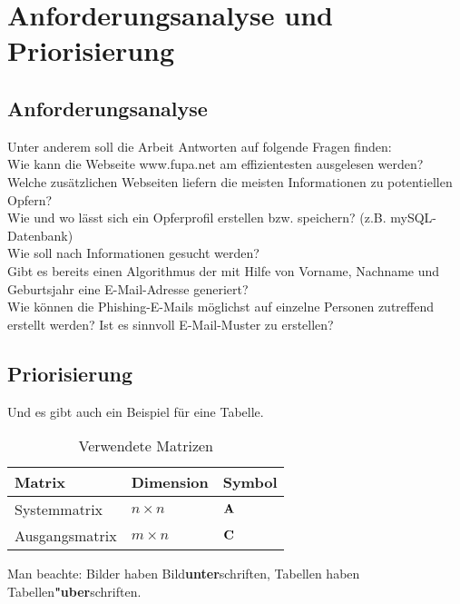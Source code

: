 
\chapter{Anforderungsanalyse und Priorisierung}  %
\label{cha:} %
\section{Anforderungsanalyse} %
\label{sec:} %

Unter anderem soll die Arbeit Antworten auf folgende Fragen finden:\\
Wie kann die Webseite www.fupa.net am effizientesten ausgelesen werden?\\
Welche zusätzlichen Webseiten liefern die meisten Informationen zu potentiellen Opfern?\\
Wie und wo lässt sich ein Opferprofil erstellen bzw. speichern? (z.B. mySQL-Datenbank)\\
Wie soll nach Informationen gesucht werden?\\
Gibt es bereits einen Algorithmus der mit Hilfe von Vorname, Nachname und Geburtsjahr eine E-Mail-Adresse generiert?\\
Wie können die Phishing-E-Mails möglichst auf einzelne Personen zutreffend erstellt werden? Ist es sinnvoll E-Mail-Muster zu erstellen?\\

\subsection{} %
\label{sse:}
\subsubsection{} %
\label{sss:}
\section{Priorisierung} %
\label{sec:} %
Und es gibt auch ein Beispiel für eine Tabelle.

\begin{table}
	\begin{center}
		\caption{Verwendete Matrizen}
		\label{matrizen}
		\begin{tabular}{|l|l|l|}
			\hline
			Matrix & Dimension & Symbol \\
			\hline
			Systemmatrix & $n \times n$ & ${\bf A}$  \\
			\hline
			Ausgangsmatrix & $m \times n$ & ${\bf C}$  \\
			\hline
		\end{tabular}
	\end{center}
\end{table}
\FloatBarrier
Man beachte: Bilder haben Bild{\bf unter}schriften, 
Tabellen haben Tabellen{\bf "uber}schriften.